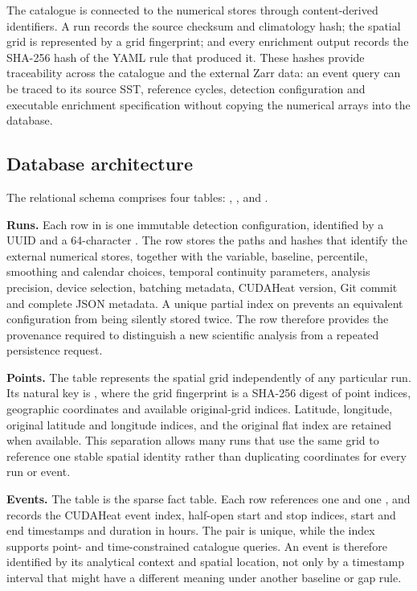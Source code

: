 The catalogue is connected to the numerical stores through content-derived identifiers. A run records the source checksum and climatology hash; the spatial grid is represented by a grid fingerprint; and every enrichment output records the SHA-256 hash of the YAML rule that produced it. These hashes provide traceability across the catalogue and the external Zarr data: an event query can be traced to its source SST, reference cycles, detection configuration and executable enrichment specification without copying the numerical arrays into the database. 

\subsection{Database architecture}
The relational schema comprises four tables: , ,  and .

\noindent\textbf{Runs.} Each row in  is one immutable detection configuration, identified by a UUID and a 64-character . The row stores the paths and hashes that identify the external numerical stores, together with the variable, baseline, percentile, smoothing and calendar choices, temporal continuity parameters, analysis precision, device selection, batching metadata, CUDAHeat version, Git commit and complete JSON metadata. A unique partial index on  prevents an equivalent configuration from being silently stored twice. The row therefore provides the provenance required to distinguish a new scientific analysis from a repeated persistence request.

\noindent\textbf{Points.} The  table represents the spatial grid independently of any particular run. Its natural key is , where the grid fingerprint is a SHA-256 digest of point indices, geographic coordinates and available original-grid indices. Latitude, longitude, original latitude and longitude indices, and the original flat index are retained when available. This separation allows many runs that use the same grid to reference one stable spatial identity rather than duplicating coordinates for every run or event.

\noindent\textbf{Events.} The  table is the sparse fact table. Each row references one  and one , and records the CUDAHeat event index, half-open start and stop indices, start and end timestamps and duration in hours. The pair  is unique, while the  index supports point- and time-constrained catalogue queries. An event is therefore identified by its analytical context and spatial location, not only by a timestamp interval that might have a different meaning under another baseline or gap rule.

